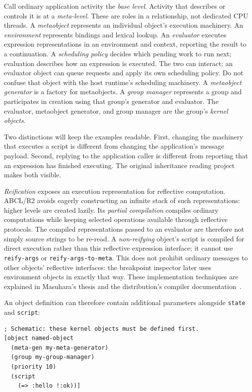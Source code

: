 \documentclass[11pt,a4paper]{article}
\newcommand{\code}[1]{\texttt{#1}}
\newenvironment{codeblock}{%
  \par\addvspace{\medskipamount}\noindent
  \begin{minipage}{\linewidth}%
  \vspace*{\medskipamount}%
  \lstset{aboveskip=0pt,belowskip=0pt}%
}{%
  \end{minipage}\par\addvspace{\medskipamount}}
\begin{document}
Call ordinary application activity the \emph{base level}.
Activity that describes or controls it is at a \emph{meta-level}.
These are roles in a relationship, not dedicated CPU threads.
A \emph{metaobject} represents an individual object's execution machinery.
An \emph{environment} represents bindings and lexical lookup.
An \emph{evaluator} executes expression representations in an environment
and context, reporting the result to a continuation.
A \emph{scheduling policy} decides which pending work to run next;
evaluation describes how an expression is executed. The two can interact:
an evaluator object can queue requests and apply its own scheduling policy.
Do not confuse that object with the host runtime's scheduling machinery.
A \emph{metaobject generator} is a factory for metaobjects.
A \emph{group manager} represents a group and participates in creation
using that group's generator and evaluator.
The evaluator, metaobject generator, and group manager are the group's
\emph{kernel objects}.

Two distinctions will keep the examples readable.
First, changing the machinery that executes a script is different from
changing the application's message payload.
Second, replying to the application caller is different from reporting
that an expression has finished executing.
The original inheritance reading project makes both visible.

\emph{Reification} exposes an execution representation for reflective
computation. ABCL/R2 avoids eagerly constructing an
infinite stack of such representations: higher levels are created lazily.
Its \emph{partial compilation} compiles ordinary computations while
keeping selected operations available through reflective protocols.
The compiled representations passed to an evaluator are therefore not
simply source strings to be re-read.
A \emph{non-reifying} object's script is compiled for direct execution
rather than this reflective expression interface; it cannot use
\code{reify-args} or \code{reify-args-to-meta}. This does not prohibit
ordinary messages to other objects' reflective interfaces: the breakpoint
inspector later uses environment objects in exactly that way.
These implementation techniques are explained in Masuhara's thesis and
the distribution's compiler documentation~\cite{masuhara,guide}.

An object definition can therefore contain additional parameters
alongside \code{state} and \code{script}:

\begin{codeblock}
\begin{lstlisting}
; Schematic: these kernel objects must be defined first.
[object named-object
  (meta-gen my-meta-generator)
  (group my-group-manager)
  (priority 10)
  (script
    (=> :hello !:ok))]
\end{lstlisting}
\end{codeblock}
\end{document}
